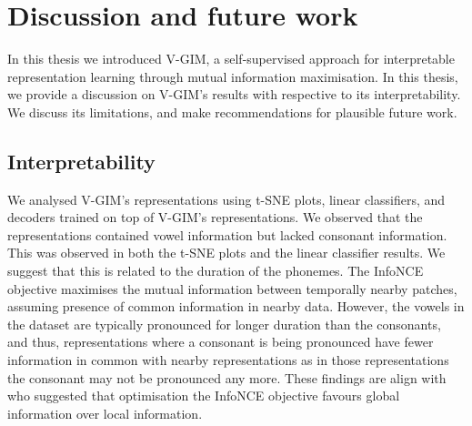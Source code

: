 \chapter{Discussion and future work}

	
In this thesis we introduced V-GIM, a self-supervised approach for interpretable representation learning through mutual information maximisation. In this thesis, we provide a discussion on V-GIM's results with respective to its interpretability. We discuss its limitations, and make recommendations for plausible future work.




\section{Interpretability}
	
	We analysed V-GIM's representations using t-SNE plots, linear classifiers, and decoders trained on top of V-GIM's representations. We observed that the representations contained vowel information but lacked consonant information. This was observed in both the t-SNE plots and the linear classifier results. We suggest that this is related to the duration of the phonemes. The InfoNCE objective maximises the mutual information between temporally nearby patches, assuming presence of common information in nearby data. However, the vowels in the dataset are typically pronounced for longer duration than the consonants, and thus, representations where a consonant is being pronounced have fewer information in common with nearby representations as in those representations the consonant may not be pronounced any more. These findings are align with \cite{lowePuttingEndEndtoEnd2020} who suggested that optimisation the InfoNCE objective favours global information over local information. 
	
